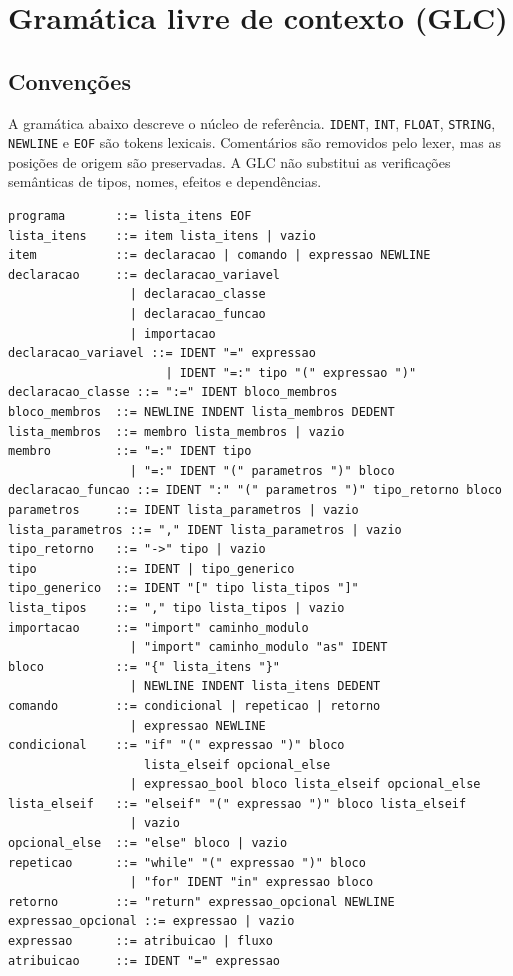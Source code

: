 \documentclass[12pt,a4paper]{article}
\begin{document}
\section{Gramática livre de contexto (GLC)}
\subsection{Convenções}
A gramática abaixo descreve o núcleo de referência. \texttt{IDENT}, \texttt{INT}, \texttt{FLOAT}, \texttt{STRING}, \texttt{NEWLINE} e \texttt{EOF} são tokens lexicais. Comentários são removidos pelo lexer, mas as posições de origem são preservadas. A GLC não substitui as verificações semânticas de tipos, nomes, efeitos e dependências.
\begin{lstlisting}
programa       ::= lista_itens EOF
lista_itens    ::= item lista_itens | vazio
item           ::= declaracao | comando | expressao NEWLINE
declaracao     ::= declaracao_variavel
                 | declaracao_classe
                 | declaracao_funcao
                 | importacao
declaracao_variavel ::= IDENT "=" expressao
                      | IDENT "=:" tipo "(" expressao ")"
declaracao_classe ::= ":=" IDENT bloco_membros
bloco_membros  ::= NEWLINE INDENT lista_membros DEDENT
lista_membros  ::= membro lista_membros | vazio
membro         ::= "=:" IDENT tipo
                 | "=:" IDENT "(" parametros ")" bloco
declaracao_funcao ::= IDENT ":" "(" parametros ")" tipo_retorno bloco
parametros     ::= IDENT lista_parametros | vazio
lista_parametros ::= "," IDENT lista_parametros | vazio
tipo_retorno   ::= "->" tipo | vazio
tipo           ::= IDENT | tipo_generico
tipo_generico  ::= IDENT "[" tipo lista_tipos "]"
lista_tipos    ::= "," tipo lista_tipos | vazio
importacao     ::= "import" caminho_modulo
                 | "import" caminho_modulo "as" IDENT
bloco          ::= "{" lista_itens "}"
                 | NEWLINE INDENT lista_itens DEDENT
comando        ::= condicional | repeticao | retorno
                 | expressao NEWLINE
condicional    ::= "if" "(" expressao ")" bloco
                   lista_elseif opcional_else
                 | expressao_bool bloco lista_elseif opcional_else
lista_elseif   ::= "elseif" "(" expressao ")" bloco lista_elseif
                 | vazio
opcional_else  ::= "else" bloco | vazio
repeticao      ::= "while" "(" expressao ")" bloco
                 | "for" IDENT "in" expressao bloco
retorno        ::= "return" expressao_opcional NEWLINE
expressao_opcional ::= expressao | vazio
expressao      ::= atribuicao | fluxo
atribuicao     ::= IDENT "=" expressao

\end{lstlisting}
\end{document}
